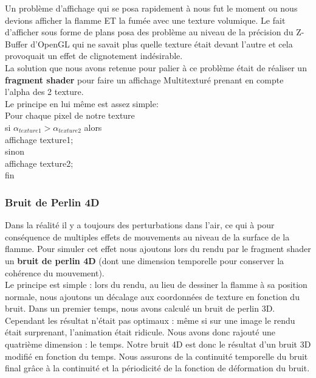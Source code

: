 \documentclass[a4paper,10pt]{article}
\begin{document}
	Un problème d'affichage qui se posa rapidement à nous fut le moment ou nous devions afficher la flamme ET la fumée avec une texture volumique. Le fait d'afficher sous forme de plans posa des problème au niveau de la précision du Z-Buffer d'OpenGL qui ne savait plus quelle texture était devant l'autre et cela provoquait un effet de clignotement indésirable.\\

La solution que nous avons retenue pour palier à ce problème était de réaliser un \textbf{fragment shader} pour faire un affichage Multitexturé prenant en compte l'alpha des 2 texture.\\

Le principe en lui même est assez simple:\\
Pour chaque pixel de notre texture\\
      si $\alpha_{texture1}>\alpha_{texture2}$ alors \\
            affichage texture1;\\
      sinon \\
            affichage texture2;\\
fin\\


\subsubsection{Bruit de Perlin 4D}

Dans la réalité il y a toujours des perturbations dans l'air, ce qui à pour conséquence de multiples effets de mouvements au niveau de la surface de la flamme. Pour simuler cet effet nous ajoutons lors du rendu par le fragment shader un \textbf{bruit de perlin 4D} (dont une dimension temporelle pour conserver la cohérence du mouvement).\\

Le principe est simple : lors du rendu, au lieu de dessiner la flamme à sa position normale, nous ajoutons un décalage aux coordonnées de texture en fonction du bruit. Dans un premier temps, nous avons calculé un bruit de perlin 3D. Cependant les résultat n'était pas optimaux : même si sur une image le rendu était surprenant, l'animation était ridicule. Nous avons donc rajouté une quatrième dimension : le temps. Notre bruit 4D est donc le résultat d'un bruit 3D modifié en fonction du temps. Nous assurons de la continuité temporelle du bruit final grâce à la continuité et la périodicité de la fonction de déformation du bruit.
\end{document}

